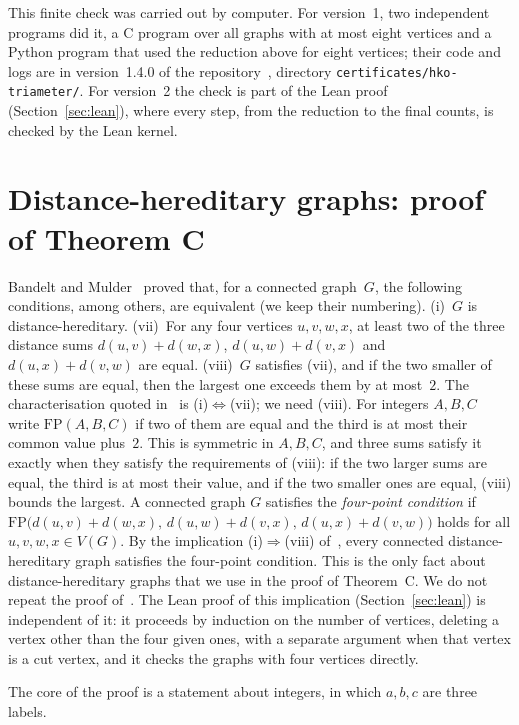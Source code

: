 \documentclass[11pt]{article}
\theoremstyle{remark}
\newcommand{\FP}{\mathrm{FP}}
\begin{document}
This finite check was carried out by computer. For version~1, two
independent programs did it, a C program over all graphs with at most eight
vertices and a Python program that used the reduction above for eight
vertices; their code and
logs are in version~1.4.0 of the repository~\cite{repo}, directory
\texttt{certificates/hko-triameter/}. For version~2 the check is part of the
Lean proof (Section~\ref{sec:lean}), where every step, from the reduction to
the final counts, is checked by the Lean kernel.

\section{Distance-hereditary graphs: proof of Theorem C}\label{sec:dh}
Bandelt and Mulder~\cite[Theorem~2]{bm} proved that, for a connected
graph~$G$, the following conditions, among others, are equivalent (we keep
their numbering). (i)~$G$ is distance-hereditary. (vii)~For any four vertices
$u,v,w,x$, at least two of the three distance sums $d(u,v)+d(w,x)$,
$d(u,w)+d(v,x)$ and $d(u,x)+d(v,w)$ are equal. (viii)~$G$ satisfies (vii),
and if the two smaller of these sums are equal, then the largest one exceeds
them by at most~$2$. The
characterisation quoted in~\cite[Section~3.2]{hko} is (i)$\Leftrightarrow$(vii);
we need (viii). For integers $A,B,C$ write $\FP(A,B,C)$ if two of them are equal
and the third is at most their common value plus~$2$. This is symmetric in
$A,B,C$, and three sums satisfy it exactly when they satisfy the requirements of
(viii): if the two larger sums are equal, the third is at most their value, and if the two
smaller ones are equal, (viii) bounds the largest. A connected graph $G$ satisfies the \emph{four-point condition} if
$\FP\bigl(d(u,v)+d(w,x),\,d(u,w)+d(v,x),\,d(u,x)+d(v,w)\bigr)$ holds for all
$u,v,w,x\in V(G)$. By the implication (i)$\Rightarrow$(viii) of~\cite[Theorem~2]{bm}, every
connected distance-hereditary graph satisfies the four-point condition. This is
the only fact about distance-hereditary graphs that we use in the proof of
Theorem~C. We do not repeat the proof of~\cite{bm}. The Lean proof of this
implication (Section~\ref{sec:lean}) is independent of it: it proceeds by
induction on the number of vertices, deleting a vertex other than the four
given ones, with a separate argument when that vertex is a cut vertex, and it
checks the graphs with four vertices directly.

The core of the proof is a statement about integers, in which $a,b,c$ are
three labels.
\end{document}
